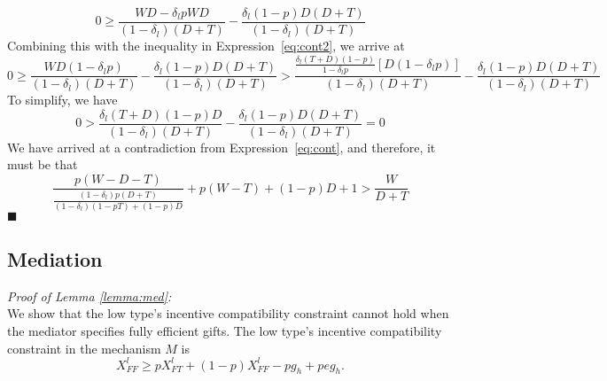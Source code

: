\documentclass[bibtex,autowc]{apsr_submission}
\newcommand{\de}{\delta}
\begin{document}
{%
\begin{equation*}
	0 \geq \frac{WD - \de_lpWD}{\left(1-\de_l\right)\left(D +	 T\right)} 
	- \frac{\de_l (1-p)D\left(D +	 T\right)}{\left(1-\de_l\right)\left(D +	 T\right)}
\end{equation*}
Combining this with the inequality in Expression~\ref{eq:cont2}, we arrive at
\begin{equation*}
	0 \geq \frac{WD(1- \de_lp)}{\left(1-\de_l\right)\left(D +	 T\right)} 
	- \frac{\de_l (1-p)D\left(D +	 T\right)}{\left(1-\de_l\right)\left(D +	 T\right)} > \frac{\frac{\de_l(T+D)(1-p)}{1-\de_l p}\left[D(1 - \de_lp)\right]}{\left(1-\de_l\right)\left(D +	 T\right)} 
	- \frac{\de_l (1-p)D\left(D +	 T\right)}{\left(1-\de_l\right)\left(D +	 T\right)}
\end{equation*}
To simplify, we have
\begin{equation*}
	0 > \frac{\de_l(T+D)(1-p)D}{\left(1-\de_l\right)\left(D +	 T\right)} 
	- \frac{\de_l (1-p)D\left(D +	 T\right)}{\left(1-\de_l\right)\left(D +	 T\right)} = 0
\end{equation*}
We have arrived at a contradiction from Expression~\ref{eq:cont}, and therefore, it must be that 
\begin{equation}
	\frac{p(W-D-T)}{\frac{\left(1-\de_l\right)p\left(D +	 T\right)}{\left(1-\de_l\right)\left(1 - pT \right) + (1-p) D}} + p (W-T) + (1-p)D + 1 > \frac{W}{D+T}
\end{equation}
 \hfill $\blacksquare$ 

\subsection{Mediation}
\emph{Proof of Lemma \ref{lemma:med}:}\\
We show that the low type's incentive compatibility constraint cannot hold when the mediator specifies fully efficient gifts. The low type's incentive compatibility constraint in the mechanism $M$ is
$$X_{FF}^l \geq pX_{FT}^l+(1-p)X_{FF}^l-pg_h+peg_h.$$

}
\end{document}
